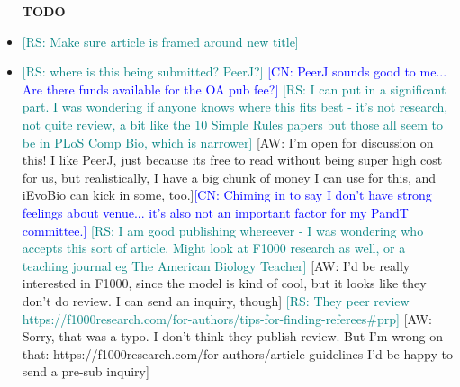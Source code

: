 \newcommand{\aw}[1]{{\textcolor{armygreen}{[AW: #1]}}} %
\newcommand{\sarah}[1]{{\textcolor{amethyst}{[SF: #1]}}} %
\newcommand{\rs}[1]{{\textcolor{teal}{[RS: #1]}}} %
\newcommand{\rsedit}[2]{\sout{#1}{\color{teal}{#2}}}
\newcommand{\jo}[1]{{\textcolor{pauburn}{[JO: #1]}}} %
\newcommand{\jedit}[2]{\sout{#1}{\color{pauburn}{#2}}}
\newcommand{\cn}[1]{{\textcolor{blue}{[CN: #1]}}} %

\begin{itemize}
\item [\textbf{TODO}]
    \item \rs{Make sure article is framed around new title}
    \item \rs{where is this being submitted? PeerJ?} \cn{PeerJ sounds good to me... Are there funds available for the OA pub fee?} \rs{I can put in a significant part. I was wondering if anyone knows where this fits best - it's not research, not quite review, a bit like the 10 Simple Rules papers but those all seem to be in PLoS Comp Bio, which is narrower} \aw{I'm open for discussion on this! I like PeerJ, just because its free to read without being super high cost for us, but realistically, I have a big chunk of money I can use for this, and iEvoBio can kick in some, too.}\cn{Chiming in to say I don't have strong feelings about venue... it's also not an important factor for my PandT committee.}
    \rs{I am good publishing whereever - I was wondering who accepts this sort of article. Might look at F1000 research as well, or a teaching journal eg The American Biology Teacher} \aw{I'd be really interested in F1000, since the model is kind of cool, but it looks like they don't do review. I can send an inquiry, though} \rs{They peer review https://f1000research.com/for-authors/tips-for-finding-referees#prp} \aw{Sorry, that was a typo. I don't think they publish review\texit{s}. But I'm wrong on that: https://f1000research.com/for-authors/article-guidelines I'd be happy to send a pre-sub inquiry}
    

\end{itemize}
